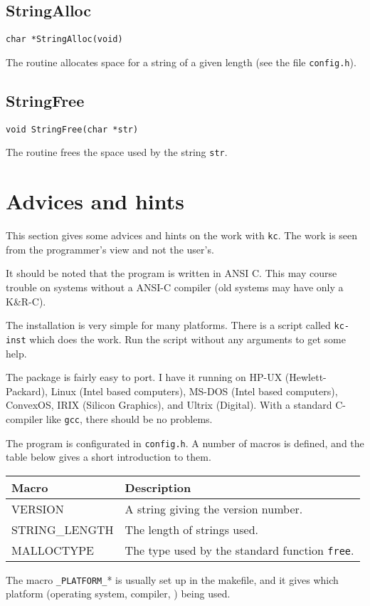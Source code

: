 \subsection{StringAlloc}
\begin{verbatim}
char *StringAlloc(void)
\end{verbatim}

The routine allocates space for a string of a given length (see the
file {\tt config.h}).

\subsection{StringFree}
\begin{verbatim}
void StringFree(char *str)
\end{verbatim}

The routine frees the space used by the string {\tt str}.


\newpage
\section{Advices and hints}
This section gives some advices and hints on the work with {\tt kc}.
The work is seen from the programmer's view and not the user's. 

It should be noted that the program is written in ANSI C. This may
course trouble on systems without a ANSI-C compiler (old systems may
have only a K{\&}R-C).

The installation is very simple for many platforms. There is a script
called {\tt kc-inst} which does the work. Run the script without any
arguments to get some help.

The package is fairly easy to port. I have it running on HP-UX
(Hewlett-Packard), Linux (Intel based computers),
MS-DOS (Intel based computers), ConvexOS, IRIX (Silicon Graphics), and
Ultrix (Digital). With  a standard C-compiler like {\tt gcc}, there
should be no problems.  

The program is configurated in {\tt config.h}. A number of macros is
defined, and the table below gives a short introduction to them.

\vspace{0.2cm}
\begin{center}
  \begin{tabular}{ll}
    \hline
    Macro     & Description \\ \hline
    VERSION   & A string giving the version number. \\
    STRING{\_}LENGTH & The length of strings used. \\
    MALLOCTYPE & The type used by the standard function {\tt free}. \\
    \hline
  \end{tabular}
\end{center}

The macro {\tt {\_}PLATFORM{\_}}* is usually set up in the makefile,
and it gives which platform (operating system, compiler, \etc) being
used.


\newpage


